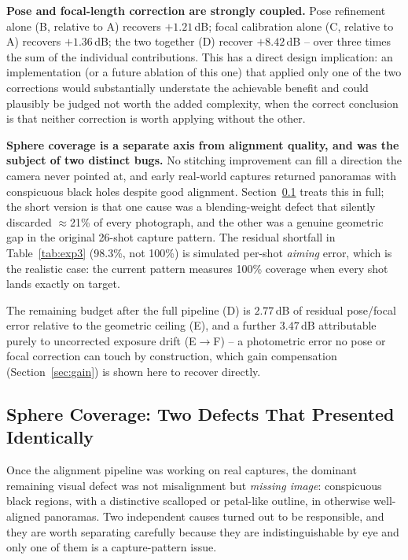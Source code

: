 \documentclass[11pt]{article}
\begin{document}
\textbf{Pose and focal-length correction are strongly coupled.} Pose refinement alone (B, relative to A) recovers $+1.21$\,dB; focal calibration alone (C, relative to A) recovers $+1.36$\,dB; the two together (D) recover $+8.42$\,dB -- over three times the sum of the individual contributions. This has a direct design implication: an implementation (or a future ablation of this one) that applied only one of the two corrections would substantially understate the achievable benefit and could plausibly be judged not worth the added complexity, when the correct conclusion is that neither correction is worth applying without the other.

\textbf{Sphere coverage is a separate axis from alignment quality, and was the subject of two distinct bugs.} No stitching improvement can fill a direction the camera never pointed at, and early real-world captures returned panoramas with conspicuous black holes despite good alignment. Section~\ref{sec:coverage} treats this in full; the short version is that one cause was a blending-weight defect that silently discarded $\approx$21\% of every photograph, and the other was a genuine geometric gap in the original 26-shot capture pattern. The residual shortfall in Table~\ref{tab:exp3} (98.3\%, not 100\%) is simulated per-shot \emph{aiming} error, which is the realistic case: the current pattern measures 100\% coverage when every shot lands exactly on target.

The remaining budget after the full pipeline (D) is $2.77$\,dB of residual pose/focal error relative to the geometric ceiling (E), and a further $3.47$\,dB attributable purely to uncorrected exposure drift (E$\to$F) -- a photometric error no pose or focal correction can touch by construction, which gain compensation (Section~\ref{sec:gain}) is shown here to recover directly.

\subsection{Sphere Coverage: Two Defects That Presented Identically}
\label{sec:coverage}

Once the alignment pipeline was working on real captures, the dominant remaining visual defect was not misalignment but \emph{missing image}: conspicuous black regions, with a distinctive scalloped or petal-like outline, in otherwise well-aligned panoramas. Two independent causes turned out to be responsible, and they are worth separating carefully because they are indistinguishable by eye and only one of them is a capture-pattern issue.
\end{document}
